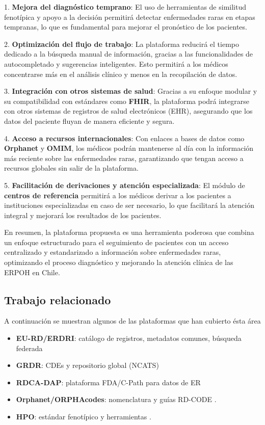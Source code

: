 \documentclass{article}
\begin{document}
1. \textbf{Mejora del diagnóstico temprano}: El uso de herramientas de similitud fenotípica y apoyo a la decisión permitirá detectar enfermedades raras en etapas tempranas, lo que es fundamental para mejorar el pronóstico de los pacientes.

2. \textbf{Optimización del flujo de trabajo}: La plataforma reducirá el tiempo dedicado a la búsqueda manual de información, gracias a las funcionalidades de autocompletado y sugerencias inteligentes. Esto permitirá a los médicos concentrarse más en el análisis clínico y menos en la recopilación de datos.

3. \textbf{Integración con otros sistemas de salud}: Gracias a su enfoque modular y su compatibilidad con estándares como \textbf{FHIR}, la plataforma podrá integrarse con otros sistemas de registros de salud electrónicos (EHR), asegurando que los datos del paciente fluyan de manera eficiente y segura.

4. \textbf{Acceso a recursos internacionales}: Con enlaces a bases de datos como \textbf{Orphanet} y \textbf{OMIM}, los médicos podrán mantenerse al día con la información más reciente sobre las enfermedades raras, garantizando que tengan acceso a recursos globales sin salir de la plataforma.

5. \textbf{Facilitación de derivaciones y atención especializada}: El módulo de \textbf{centros de referencia} permitirá a los médicos derivar a los pacientes a instituciones especializadas en caso de ser necesario, lo que facilitará la atención integral y mejorará los resultados de los pacientes.

En resumen, la plataforma propuesta es una herramienta poderosa que combina un enfoque estructurado para el seguimiento de pacientes con un acceso centralizado y estandarizado a información sobre enfermedades raras, optimizando el proceso diagnóstico y mejorando la atención clínica de las ERPOH en Chile.


 

\subsection{Trabajo relacionado}
A continuación se muestran algunos de las plataformas que han cubierto ésta área
\begin{itemize}[leftmargin=1.2em]
  \item \textbf{EU-RD/ERDRI}: catálogo de registros, metadatos comunes, búsqueda federada
  \item \textbf{GRDR}: CDEs y repositorio global (NCATS) 
  \item \textbf{RDCA-DAP}: plataforma FDA/C-Path para datos de ER 
  \item \textbf{Orphanet/ORPHAcodes}: nomenclatura y guías RD-CODE \cite{orpha2025}.
  \item \textbf{HPO}: estándar fenotípico y herramientas \cite{kohler2021nar,hpo2024}.
\end{itemize}
\end{document}
